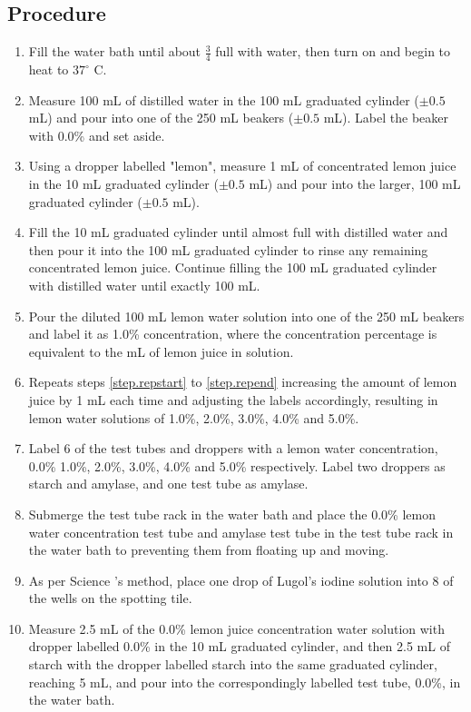 \documentclass[12pt]{article}
\begin{document}
\subsection{Procedure}

\begin{enumerate}
    \item Fill the water bath until about $\frac{3}{4}$ full with water, then turn on and begin to heat to $37^\circ$ C.
    \item Measure 100 mL of distilled water in the 100 mL graduated cylinder ($\pm 0.5$ mL) and pour into one of the 250 mL beakers ($\pm 0.5$ mL). Label the beaker with 0.0\% and set aside. 
    \item\label{step.repstart} Using a dropper labelled "lemon", measure 1 mL of concentrated lemon juice in the 10 mL graduated cylinder ($\pm 0.5$ mL) and pour into the larger, 100 mL graduated cylinder ($\pm 0.5$ mL).
    \item Fill the 10 mL graduated cylinder until almost full with distilled water and then pour it into the 100 mL graduated cylinder to rinse any remaining concentrated lemon juice. Continue filling the 100 mL graduated cylinder with distilled water until exactly 100 mL.
    \item\label{step.repend} Pour the diluted 100 mL lemon water solution into one of the 250 mL beakers and label it as 1.0\% concentration, where the concentration percentage is equivalent to the mL of lemon juice in solution.
    \item Repeats steps \ref{step.repstart} to \ref{step.repend} increasing the amount of lemon juice by 1 mL each time and adjusting the labels accordingly, resulting in lemon water solutions of 1.0\%, 2.0\%, 3.0\%, 4.0\% and 5.0\%.
    \item Label 6 of the test tubes and droppers with a lemon water concentration, 0.0\% 1.0\%, 2.0\%, 3.0\%, 4.0\% and 5.0\% respectively. Label two droppers as starch and amylase, and one test tube as amylase. 
    \item Submerge the test tube rack in the water bath and place the 0.0\% lemon water concentration test tube and amylase test tube in the test tube rack in the water bath to preventing them from floating up and moving. 
    \item\label{step.amystart} As per Science \citeauthor{science_skool_2018}'s method, place one drop of Lugol's iodine solution into 8 of the wells on the spotting tile.
    \item Measure 2.5 mL of the 0.0\% lemon juice concentration water solution with dropper labelled 0.0\% in the 10 mL graduated cylinder, and then 2.5 mL of starch with the dropper labelled starch into the same graduated cylinder, reaching 5 mL,  and pour into the correspondingly labelled test tube, 0.0\%, in the water bath.

\end{enumerate}
\end{document}
